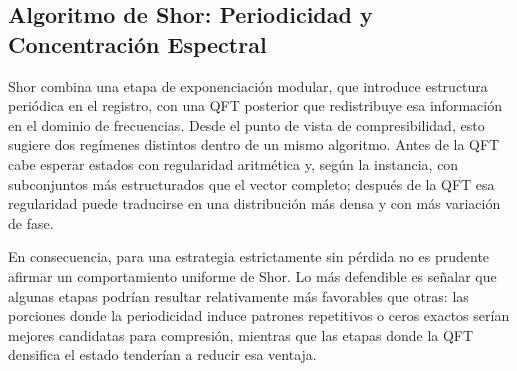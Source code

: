 \subsection{Algoritmo de Shor: Periodicidad y Concentración Espectral}
\label{subsec:patrones_shor}

Shor combina una etapa de exponenciación modular, que introduce estructura periódica en el registro, con una QFT posterior que redistribuye esa información en el dominio de frecuencias. Desde el punto de vista de compresibilidad, esto sugiere dos regímenes distintos dentro de un mismo algoritmo. Antes de la QFT cabe esperar estados con regularidad aritmética y, según la instancia, con subconjuntos más estructurados que el vector completo; después de la QFT esa regularidad puede traducirse en una distribución más densa y con más variación de fase.

En consecuencia, para una estrategia estrictamente sin pérdida no es prudente afirmar un comportamiento uniforme de Shor. Lo más defendible es señalar que algunas etapas podrían resultar relativamente más favorables que otras: las porciones donde la periodicidad induce patrones repetitivos o ceros exactos serían mejores candidatas para compresión, mientras que las etapas donde la QFT densifica el estado tenderían a reducir esa ventaja.
